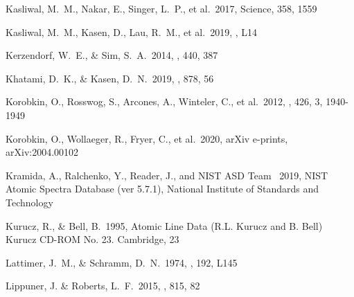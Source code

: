 \documentclass[twocolumn]{aastex63}
\begin{document}
\begin{thebibliography}{}
 Kasliwal, M.~M., Nakar, E., Singer, L.~P., et al.\ 2017, Science, 358, 1559

 Kasliwal, M.~M., Kasen, D., Lau, R.~M., et al.\ 2019, \mnras, L14



 Kerzendorf, W.~E., \& Sim, S.~A.\ 2014, \mnras, 440, 387

 Khatami, D.~K., \& Kasen, D.~N.\ 2019, \apj, 878, 56

 Korobkin, O., Rosswog, S., Arcones, A., Winteler, C., et al.\ 2012, \mnras, 426, 3, 1940-1949

 Korobkin, O., Wollaeger, R., Fryer, C., et al.\ 2020, arXiv e-prints, arXiv:2004.00102


 Kramida, A., Ralchenko, Y., Reader, J., and {NIST ASD Team} \ 2019, NIST Atomic Spectra Database (ver 5.7.1), National Institute of Standards and Technology

 Kurucz, R., \& Bell, B.\ 1995, Atomic Line Data (R.L. Kurucz and B. Bell) Kurucz CD-ROM No. 23. Cambridge, 23



 Lattimer, J.~M., \& Schramm, D.~N.\ 1974, \apjl, 192, L145


 Lippuner, J. \& Roberts, L.~F.\ 2015, \apj, 815, 82



\end{thebibliography}
\end{document}
